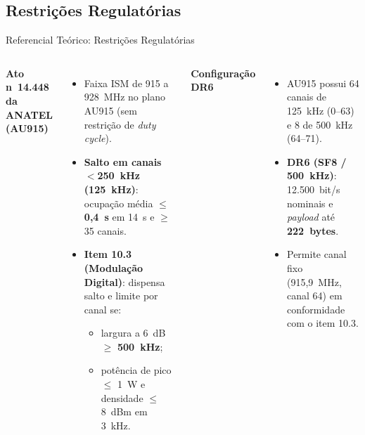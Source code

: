 \documentclass[
    aspectratio=169,
    11pt,
    brazil
]{beamer}
\begin{document}
\subsection{Restrições Regulatórias}
\begin{frame}{Referencial Teórico: Restrições Regulatórias}
  \begin{columns}[t]
    {\footnotesize\bfseries\color{senacblue}Ato n\textordmasculine~14.448 da ANATEL (AU915)}
    \begin{itemize}\scriptsize
      \setlength{\itemsep}{3pt}
      \item Faixa ISM de 915 a 928~MHz no plano AU915 (sem restrição de \textit{duty cycle}).
      \item \textbf{Salto em canais $<$250~kHz (125~kHz)}: ocupação média $\leq$ \textbf{0,4~s} em 14~s e $\geq$35 canais.
      \item \textbf{Item 10.3 (Modulação Digital)}: dispensa salto e limite por canal se:
        \begin{itemize}\tiny
          \item largura a 6~dB $\geq$ \textbf{500~kHz};
          \item potência de pico $\leq$ 1~W e densidade $\leq$ 8~dBm em 3~kHz.
        \end{itemize}
    \end{itemize}
    {\footnotesize\bfseries\color{senacblue}Configuração DR6}
    \begin{itemize}\scriptsize
      \setlength{\itemsep}{3pt}
      \item AU915 possui 64 canais de 125~kHz (0--63) e 8 de 500~kHz (64--71).
      \item \textbf{DR6 (SF8 / 500~kHz)}: 12.500~bit/s nominais e \textit{payload} até \textbf{222~bytes}.
      \item Permite canal fixo (915,9~MHz, canal 64) em conformidade com o item 10.3.
    \end{itemize}
  \end{columns}
\end{frame}
\end{document}
